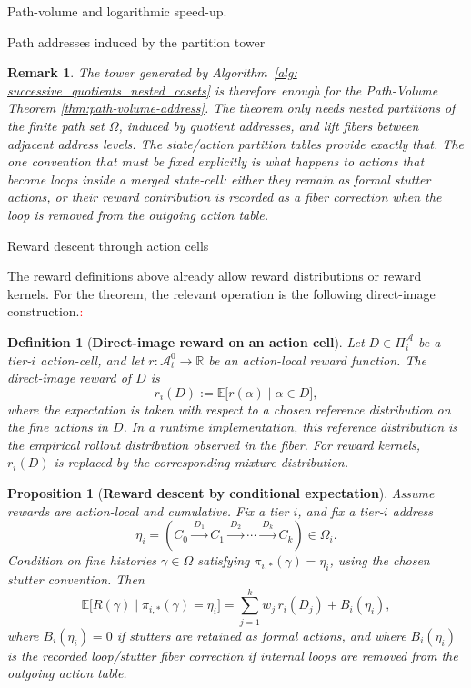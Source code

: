 \documentclass[11pt]{article}
\newtheorem{definition}[subsubsection]{Definition}
\newtheorem{remark}[subsubsection]{Remark}
\newtheorem{proposition}[subsubsection]{Proposition}
\newcommand{\E}{\mathbb{E}}
\newcommand{\R}{\mathbb{R}}
\begin{document}
\begin{section}{Path-volume and logarithmic speed-up.}
\begin{subsection}{Path addresses induced by the partition tower}
\begin{remark}
\normalfont
The tower generated by Algorithm~\ref{alg: successive_quotients_nested_cosets} is therefore enough for the Path-Volume Theorem \ref{thm:path-volume-address}. The theorem only needs nested partitions of the finite path set $\Omega$, induced by quotient addresses, and lift fibers between adjacent address levels. The state/action partition tables provide exactly that. The one convention that must be fixed explicitly is what happens to actions that become loops inside a merged state-cell: either they remain as formal stutter actions, or their reward contribution is recorded as a fiber correction when the loop is removed from the outgoing action table.
\end{remark}

\end{subsection}

\begin{subsection}{Reward descent through action cells}

The reward definitions above already allow reward distributions or reward kernels. For the theorem, the relevant operation is the following direct-image construction.\textcolor{red}{:}

\begin{definition}[{\bf Direct-image reward on an action cell}]\label{def:direct-image-action-cell-reward}
\normalfont
Let $D\in\Pi_i^{\mathcal A}$ be a tier-$i$ action-cell, and let $r:\mathcal{A}_t^0\to\R$ be an action-local reward function. The direct-image reward of $D$ is
$$
r_i(D)
:=
\E\bigl[r(\alpha)\mid \alpha\in D\bigr],
$$
where the expectation is taken with respect to a chosen reference distribution on the fine actions in $D$. In a runtime implementation, this reference distribution is the empirical rollout distribution observed in the fiber. For reward kernels, $r_i(D)$ is replaced by the corresponding mixture distribution.
\end{definition}

\begin{proposition}[{\bf Reward descent by conditional expectation}]\label{prop:reward-descent-partition}
Assume rewards are action-local and cumulative. Fix a tier $i$, and fix a tier-$i$ address
$$
\eta_i
=
\left(
C_0\xrightarrow{\ D_1\ }C_1
\xrightarrow{\ D_2\ }\cdots
\xrightarrow{\ D_k\ }C_k
\right)
\in\Omega_i.
$$
Condition on fine histories $\gamma\in\Omega$ satisfying $\pi_{i,*}(\gamma)=\eta_i$, using the chosen stutter convention. Then
$$
\E\bigl[R(\gamma)\mid \pi_{i,*}(\gamma)=\eta_i\bigr]
=
\sum_{j=1}^{k}w_j\,r_i(D_j)
+B_i(\eta_i),
$$
where $B_i(\eta_i)=0$ if stutters are retained as formal actions, and where $B_i(\eta_i)$ is the recorded loop/stutter fiber correction if internal loops are removed from the outgoing action table.
\end{proposition}


\end{subsection}
\end{section}
\end{document}
